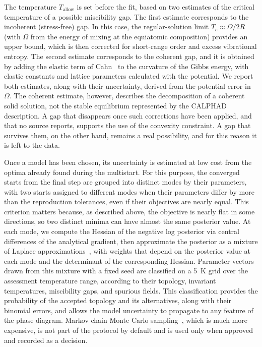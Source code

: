 The temperature $T_{\mathrm{allow}}$ is set before the fit, based on two estimates of the critical temperature of a possible miscibility gap. The first estimate corresponds to the incoherent (stress-free) gap. In this case, the regular-solution limit $T_c \approx \Omega/2R$ (with $\Omega$ from the energy of mixing at the equiatomic composition) provides an upper bound, which is then corrected for short-range order and excess vibrational entropy. The second estimate corresponds to the coherent gap, and it is obtained by adding the elastic term of Cahn~\cite{cahn1961spinodal} to the curvature of the Gibbs energy, with elastic constants and lattice parameters calculated with the potential. We report both estimates, along with their uncertainty, derived from the potential error in $\Omega$. The coherent estimate, however, describes the decomposition of a coherent solid solution, not the stable equilibrium represented by the CALPHAD description. A gap that disappears once such corrections have been applied, and that no source reports, supports the use of the convexity constraint. A gap that survives them, on the other hand, remains a real possibility, and for this reason it is left to the data.

Once a model has been chosen, its uncertainty is estimated at low cost from the optima already found during the multistart. For this purpose, the converged starts from the final step are grouped into distinct modes by their parameters, with two starts assigned to different modes when their parameters differ by more than the reproduction tolerances, even if their objectives are nearly equal. This criterion matters because, as described above, the objective is nearly flat in some directions, so two distinct minima can have almost the same posterior value. At each mode, we compute the Hessian of the negative log posterior via central differences of the analytical gradient, then approximate the posterior as a mixture of Laplace approximations~\cite{tierney1986laplace}, with weights that depend on the posterior value at each mode and the determinant of the corresponding Hessian. Parameter vectors drawn from this mixture with a fixed seed are classified on a \qty{5}{\K} grid over the assessment temperature range, according to their topology, invariant temperatures, miscibility gaps, and spurious fields. This classification provides the probability of the accepted topology and its alternatives, along with their binomial errors, and allows the model uncertainty to propagate to any feature of the phase diagram. Markov chain Monte Carlo sampling~\cite{honarmandi2019bayesian,kunselman2026hmc}, which is much more expensive, is not part of the protocol by default and is used only when approved and recorded as a decision.

